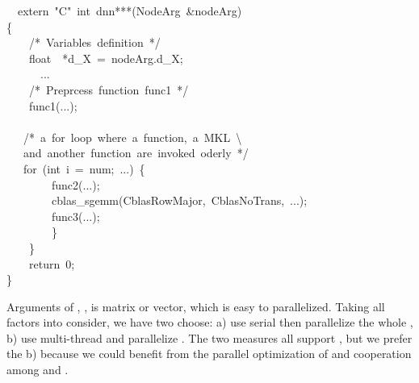 \documentclass{article}
\begin{document}
\begin{mdpre}%
\noindent~~extern~{"}{C}{"}~{int}~dnn***({NodeArg}~\&nodeArg)\\
\{\\
~~~~{/*}{~Variables~definition~}{*/}\\
~~~~{float}~~*d\_X~=~nodeArg.d\_X;\\
~~~~~~...\\
~~~~{/*}{~Preprcess~function~func1~}{*/}\\
~~~~func1(...);\\
\\
~~~{/*}{~a~for~loop~where~a~function,~a~MKL~\textbackslash{}}\\
{~~~and~another~function~are~invoked~oderly~}{*/}\\
~~~{for}~({int}~i~=~num;~...)~\{\\
~~~~~~~~func2(...);\\
~~~~~~~~cblas\_sgemm({CblasRowMajor},~{CblasNoTrans},~...);\\
~~~~~~~~func3(...);\\
~~~~~~~~\}\\
~~~~\}~\\
~~~~{return}~{0};\\
\}\\
\end{mdpre}\noindent{}Arguments of , ,  is matrix or vector, which is easy to parallelized. Taking all factors into consider, we have two choose: a) use serial  then parallelize the whole , b) use multi-thread  and parallelize . The two measures all support , but we prefer the b) because we could benefit from the parallel optimization of  and cooperation among  and .
\end{document}
